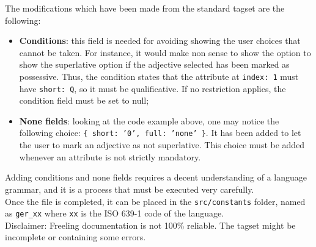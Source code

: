 The modifications which have been made from the standard tagset are the following:
\begin{itemize}
\item \textbf{Conditions}: this field is needed for avoiding showing the user choices that cannot be taken. For instance, it would make non sense to show the option to show the superlative option if the adjective selected has been marked as possessive. Thus, the condition states that the attribute at \texttt{index: 1} must have \texttt{short: Q}, so it must be qualificative. If no restriction applies, the condition field must be set to null;
\item \textbf{None fields}: looking at the code example above, one may notice the following choice: \texttt{\{ short: '0', full: 'none' \}}. It has been added to let the user to mark an adjective as not superlative. This choice must be added whenever an attribute is not strictly mandatory.
\end{itemize}
Adding conditions and none fields requires a decent understanding of a language grammar, and it is a process that must be executed very carefully.\\
Once the file is completed, it can be placed in the \texttt{src/constants} folder, named as \texttt{ger\_xx} where \texttt{xx} is the ISO 639-1 code of the language.\\
Disclaimer: Freeling documentation is not 100\% reliable. The tagset might be incomplete or containing some errors.




